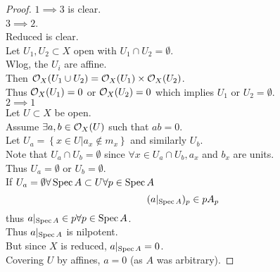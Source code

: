 \documentclass[../main.tex]{subfiles}
\begin{document}
\begin{proof}
$1\implies 3$ is clear.\\
$3\implies 2$.\\
Reduced is clear.\\
Let $U_1,U_2 \subset X$ open with $U_1 \cap U_2= \emptyset$.\\
Wlog, the $U_i$ are affine.\\
Then $\mathcal{O}_X( U_1 \cup U_2)= \mathcal{O}_X( U_1) \times \mathcal{O}_X( U_2)  $.\\
Thus $\mathcal{O}_X( U_1) =0 $ or $\mathcal{O}_X( U_2)= 0 $ which implies $U_1$ or $U_2= \emptyset$.\\
$2\implies 1$\\
Let $U \subset X$ be open.\\
Assume $\exists a,b \in \mathcal{O}_X( U) $ such that $ab = 0$.\\
Let $U_a = \left\{ x\in U | a_x \notin m_x \right\} $ and similarly $U_b$.\\
Note that $U_a \cap U_b = \emptyset$ since $\forall x \in U_a \cap U_b, a_x$ and $b_x$ are units.\\
Thus $U_a= \emptyset $ or $U_b = \emptyset$.\\
If $U_a = \emptyset \forall \operatorname{Spec} A \subset U \forall p \in \operatorname{Spec} A$ 
\[ 
	( a|_{\operatorname{Spec} A} ) _{p} \in p A_p
\]
thus $a|_{\operatorname{Spec} A} \in p \forall p \in \operatorname{Spec} A$.\\
Thus $a|_{\operatorname{Spec} A} $ is nilpotent.\\
But since $X$ is reduced, $a|_{\operatorname{Spec} A} =0$.\\
Covering $U$ by affines, $a= 0$ (as $A$ was arbitrary).
\end{proof}
\end{document}
